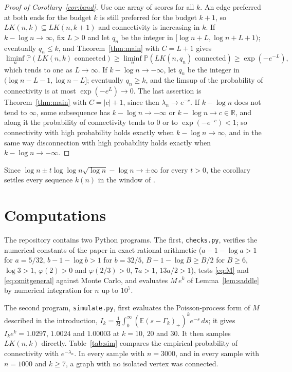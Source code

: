 \documentclass[11pt]{amsart}
\theoremstyle{remark}
\numberwithin{equation}{section}
\newcommand{\E}{\mathbb E}
\newcommand{\Pp}{\mathbb P}
\newcommand{\1}{\mathbf 1}
\begin{document}
\begin{proof}[Proof of Corollary~\ref{cor:band}]
Use one array of scores for all $k$. An edge preferred at both ends for the budget $k$ is still preferred for the budget $k+1$, so $LK(n,k)\subseteq LK(n,k+1)$ and connectivity is increasing in $k$. If $k-\log n\to\infty$, fix $L>0$ and let $q_n$ be the integer in $[\log n+L,\log n+L+1)$; eventually $q_n\le k$, and Theorem~\ref{thm:main} with $C=L+1$ gives
\[
\liminf_n\Pp(LK(n,k)\text{ connected})\ge\liminf_n\Pp(LK(n,q_n)\text{ connected})\ge\exp(-e^{-L}),
\]
which tends to one as $L\to\infty$. If $k-\log n\to-\infty$, let $q_n$ be the integer in $(\log n-L-1,\log n-L]$; eventually $q_n\ge k$, and the limsup of the probability of connectivity is at most $\exp(-e^{L})\to0$. The last assertion is Theorem~\ref{thm:main} with $C=|c|+1$, since then $\lambda_n\to e^{-c}$. If $k-\log n$ does not tend to $\infty$, some subsequence has $k-\log n\to-\infty$ or $k-\log n\to c\in\mathbb R$, and along it the probability of connectivity tends to $0$ or to $\exp(-e^{-c})<1$; so connectivity with high probability holds exactly when $k-\log n\to\infty$, and in the same way disconnection with high probability holds exactly when $k-\log n\to-\infty$.
\end{proof}

Since $\log n\pm t\log\log n\sqrt{\log n}-\log n\to\pm\infty$ for every $t>0$, the corollary settles every sequence $k(n)$ in the window of \cite{DS}.

\section{Computations}\label{sec:numerics}

The repository \cite{code} contains two Python programs. The first, \texttt{checks.py}, verifies the numerical constants of the paper in exact rational arithmetic ($a-1-\log a>1$ for $a=5/32$, $b-1-\log b>1$ for $b=32/5$, $B-1-\log B\ge B/2$ for $B\ge6$, $\log3>1$, $\varphi(2)>0$ and $\varphi(2/3)>0$, $7a>1$, $13a/2>1$), tests \eqref{eq:M} and \eqref{eq:omitgeneral} against Monte Carlo, and evaluates $M\,e^k$ of Lemma~\ref{lem:saddle} by numerical integration for $n$ up to $10^7$.

The second program, \texttt{simulate.py}, first evaluates the Poisson-process form of $M$ described in the introduction, $I_k=\frac1{k!}\int_0^\infty(\E(s-\Gamma_k)_+)^ke^{-s}\,ds$; it gives $I_ke^k=1.0297$, $1.0024$ and $1.00003$ at $k=10$, $20$ and $30$. It then samples $LK(n,k)$ directly. Table~\ref{tab:sim} compares the empirical probability of connectivity with $e^{-\lambda_n}$. In every sample with $n=3000$, and in every sample with $n=1000$ and $k\ge7$, a graph with no isolated vertex was connected.
\end{document}
